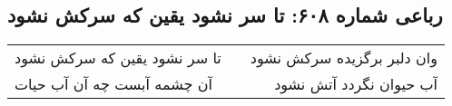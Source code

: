 \begin{center}
\section*{رباعی شماره ۶۰۸: تا سر نشود یقین که سرکش نشود}
\label{sec:0608}
\begin{longtable}{l p{0.5cm} r}
تا سر نشود یقین که سرکش نشود
&&
وان دلبر برگزیده سرکش نشود
\\
آن چشمه آبست چه آن آب حیات
&&
آب حیوان نگردد آتش نشود
\\
\end{longtable}
\end{center}
